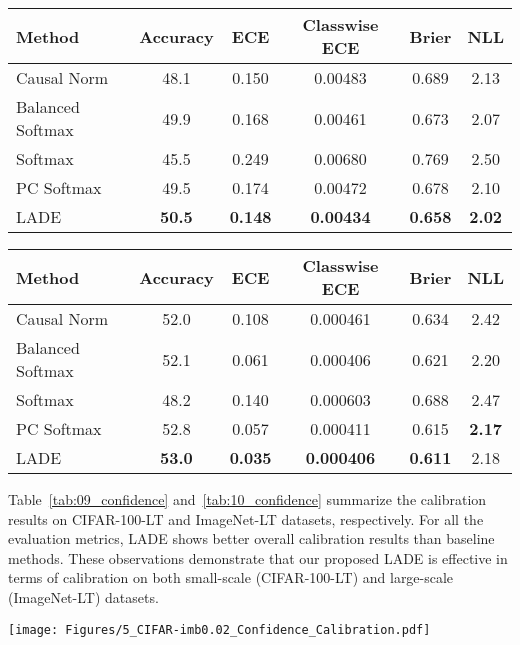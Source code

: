 \documentclass[final]{cvpr}
\begin{document}
\begin{table*}[h]
\footnotesize
\centering
\caption{Confidence calibration results on CIFAR-100-LT with imbalance ratio of 50.}
{
\begin{tabular}{l c c c c c}
\toprule
Method & Accuracy & ECE & Classwise ECE & Brier & NLL \\
\midrule
Causal Norm                    & 48.1 & 0.150 &0.00483& 0.689 & 2.13 \\
Balanced Softmax               & 49.9 & 0.168 &0.00461& 0.673 & 2.07 \\
Softmax                        & 45.5 & 0.249 &0.00680& 0.769 & 2.50 \\
\midrule
PC Softmax                     & 49.5 & 0.174 &0.00472& 0.678 & 2.10 \\
LADE                           & \textbf{50.5} &\textbf{0.148}&\textbf{0.00434}& \textbf{0.658} & \textbf{2.02} \\
\bottomrule
\end{tabular}
}
\label{tab:09_confidence}
\end{table*} \begin{table*}[h]
\footnotesize
\centering
\caption{Confidence calibration results on ImageNet-LT.}
{
\begin{tabular}{l c c c c c}
\toprule
Method & Accuracy & ECE & Classwise ECE & Brier & NLL \\
\midrule
Causal Norm                    & 52.0 & 0.108 &0.000461 & 0.634 & 2.42 \\
Balanced Softmax               & 52.1 & 0.061 &0.000406& 0.621 & 2.20 \\
Softmax                        & 48.2 & 0.140 &0.000603& 0.688 & 2.47 \\
\midrule
PC Softmax                     & 52.8 & {0.057} &0.000411& 0.615 & \textbf{2.17} \\
LADE                           & \textbf{53.0} & \textbf{0.035} & \textbf{0.000406} & \textbf{0.611} & 2.18 \\
\bottomrule
\end{tabular}
}
\label{tab:10_confidence}
\end{table*} Table~\ref{tab:09_confidence} and~\ref{tab:10_confidence} summarize the calibration results on CIFAR-100-LT and ImageNet-LT datasets, respectively.
For all the evaluation metrics, LADE shows better overall calibration results than baseline methods.
These observations demonstrate that our proposed LADE is effective in terms of calibration on both small-scale (CIFAR-100-LT) and large-scale (ImageNet-LT) datasets.

\clearpage
\begin{figure*}[t]
\begin{center}
\texttt{[image: Figures/5\_CIFAR-imb0.02\_Confidence\_Calibration.pdf]}
\end{center}
\vspace{-10px}
\caption{Reliability diagrams of ResNet-32~\cite{he2016deep} on CIFAR-100-LT with imbalance ratio of 50.
}
\label{fig:5_cifar_confidence_calibration}
\end{figure*}  
\end{document}
